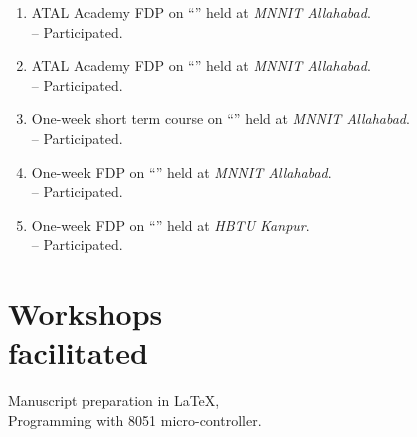 \begin{enumerate}[label={\textbf{\arabic*}.\ }]
\item ATAL Academy FDP on ``” held at {\sl MNNIT Allahabad}.\\-- Participated.
\item ATAL Academy FDP on ``” held at {\sl MNNIT Allahabad}.\\-- Participated.
\item One-week short term course on ``” held at {\sl MNNIT Allahabad}.\\-- Participated.
\item One-week FDP on ``” held at {\sl MNNIT Allahabad}.\\-- Participated.
\item One-week FDP on ``” held at {\sl HBTU Kanpur}.\\-- Participated.
\end{enumerate}
\vspace{-2em}
\sectionline
\vspace{-2.5em}\section{Workshops\\ facilitated}
Manuscript preparation in LaTeX,\\ Programming with 8051 micro-controller.
\vspace{-1em}
\\\sectionline